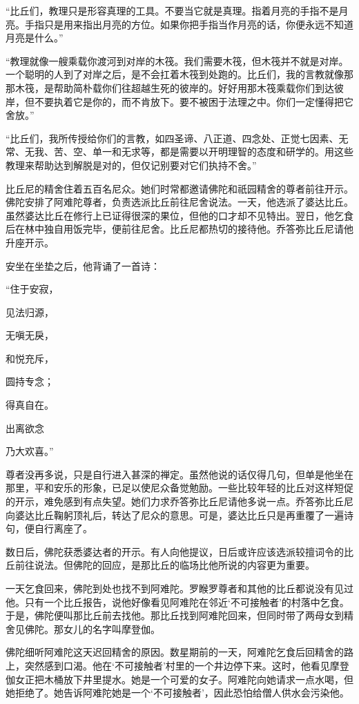 \documentclass[12pt,twoside,openany]{book}
\begin{document}
“比丘们，教理只是形容真理的工具。不要当它就是真理。指着月亮的手指不是月亮。手指只是用来指出月亮的方位。如果你把手指当作月亮的话，你便永远不知道月亮是什么。”

“教理就像一艘乘载你渡河到对岸的木筏。我们需要木筏，但木筏并不就是对岸。一个聪明的人到了对岸之后，是不会扛着木筏到处跑的。比丘们，我的言教就像那那木筏，是帮助简朴载你们往超越生死的彼岸的。好好用那木筏乘载你们到达彼岸，但不要执着它是你的，而不肯放下。要不被困于法理之中。你们一定懂得把它舍放。”

“比丘们，我所传授给你们的言教，如四圣谛、八正道、四念处、正觉七因素、无常、无我、苦、空、单一和无求等，都是需要以开明理智的态度和研学的。用这些教理来帮助达到解脱是对的，但仅记别要对它们执持不舍。”

比丘尼的精舍住着五百名尼众。她们时常都邀请佛陀和祇园精舍的尊者前往开示。佛陀安排了阿难陀尊者，负责选派比丘前往尼舍说法。一天，他选派了婆达比丘。虽然婆达比丘在修行上已证得很深的果位，但他的口才却不见特出。翌日，他乞食后在林中独自用饭完毕，便前往尼舍。比丘尼都热切的接待他。乔答弥比丘尼请他升座开示。

安坐在坐垫之后，他背诵了一首诗：

“住于安寂，

见法归源，

无嗔无戾，

和悦充斥，

圆持专念；

得真自在。

出离欲念

乃大欢喜。”

尊者没再多说，只是自行进入甚深的禅定。虽然他说的话仅得几句，但单是他坐在那里，平和安乐的形象，已足以使尼众备觉勉励。一些比较年轻的比丘对这样短促的开示，难免感到有点失望。她们力求乔答弥比丘尼请他多说一点。乔答弥比丘尼向婆达比丘鞠躬顶礼后，转达了尼众的意思。可是，婆达比丘只是再重覆了一遍诗句，便自行离座了。

数日后，佛陀获悉婆达者的开示。有人向他提议，日后或许应该选派较擅词令的比丘前往说法。但佛陀的回应，是那比丘的临场比他所说的内容更为重要。

一天乞食回来，佛陀到处也找不到阿难陀。罗睺罗尊者和其他的比丘都说没有见过他。只有一个比丘报告，说他好像看见阿难陀在邻近‘不可接触者’的村落中乞食。于是，佛陀便叫那比丘前去找他。那比丘找到阿难陀回来，但同时带了两母女到精舍见佛陀。那女儿的名字叫摩登伽。

佛陀细听阿难陀这天迟回精舍的原因。数星期前的一天，阿难陀乞食后回精舍的路上，突然感到口渴。他在‘不可接触者’村里的一个井边停下来。这时，他看见摩登伽女正把木桶放下井里提水。她是一个可爱的女子。阿难陀向她请求一点水喝，但她拒绝了。她告诉阿难陀她是一个‘不可接触者’，因此恐怕给僧人供水会污染他。
\end{document}
